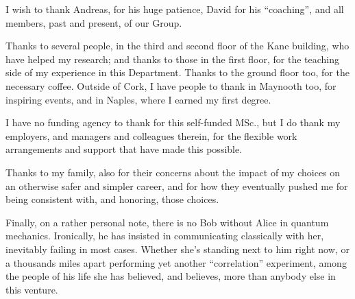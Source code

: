 I wish to thank Andreas, for his huge patience, David for
his ``coaching'',
and all members, past and present, of our Group.

Thanks to several people, in the third and second floor of the Kane building,
who have helped my research; and thanks to those in the first floor,
for the teaching side of my experience in this Department.
Thanks to the ground floor too, for the necessary coffee.
Outside of Cork, I have people to thank in Maynooth too,
for inspiring events,
and in Naples,
where I earned my first degree.

I have no funding agency to thank for this self-funded MSc.,
but I do thank my employers, and managers and colleagues therein,
for the flexible work arrangements and support that have made this possible.

Thanks to my family, also for their concerns about the impact of my choices on an otherwise safer and simpler career,
and for how they eventually pushed me for being consistent with, and honoring, those choices.

Finally, on a rather personal note, there is no Bob without Alice in quantum mechanics.
Ironically, he has insisted in communicating classically with her,
inevitably failing in most cases.
Whether she's standing next to him right now,
or a thousands miles apart performing yet another ``correlation'' experiment,
among the people of his life
she has believed, and believes, more than anybody else in this venture.
